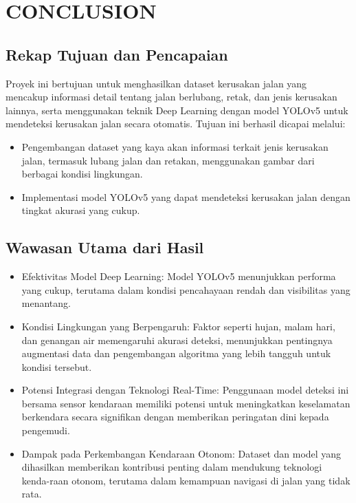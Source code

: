 \documentclass[12pt,a4paper]{article}
\begin{document}
\section{CONCLUSION}
\begin{adjustwidth}{3em}{0pt}
\subsection{Rekap Tujuan dan Pencapaian}
\hspace{0.5cm} Proyek ini bertujuan untuk menghasilkan dataset kerusakan jalan yang mencakup informasi detail tentang jalan berlubang, retak, dan jenis kerusakan lainnya, serta menggunakan teknik Deep Learning dengan model YOLOv5 untuk mendeteksi kerusakan jalan secara otomatis. Tujuan ini berhasil dicapai melalui:
\begin{itemize}
    \item Pengembangan dataset yang kaya akan informasi terkait jenis kerusakan jalan, termasuk lubang jalan dan retakan, menggunakan gambar dari berbagai kondisi lingkungan.
    \item Implementasi model YOLOv5 yang dapat mendeteksi kerusakan jalan dengan tingkat akurasi yang cukup.
\end{itemize}

\subsection{Wawasan Utama dari Hasil}
\begin{itemize}
    \item Efektivitas Model Deep Learning: Model YOLOv5 menunjukkan performa yang cukup, terutama dalam kondisi pencahayaan rendah dan visibilitas yang menantang.
    \item Kondisi Lingkungan yang Berpengaruh: Faktor seperti hujan, malam hari, dan genangan air memengaruhi akurasi deteksi, menunjukkan pentingnya augmentasi data dan pengembangan algoritma yang lebih tangguh untuk kondisi tersebut.
    \item Potensi Integrasi dengan Teknologi Real-Time: Penggunaan model deteksi ini bersama sensor kendaraan memiliki potensi untuk meningkatkan keselamatan berkendara secara signifikan dengan memberikan peringatan dini kepada pengemudi.
    \item Dampak pada Perkembangan Kendaraan Otonom: Dataset dan model yang dihasilkan memberikan kontribusi penting dalam mendukung teknologi kenda-raan otonom, terutama dalam kemampuan navigasi di jalan yang tidak rata.
\end{itemize}


\end{adjustwidth}
\end{document}
